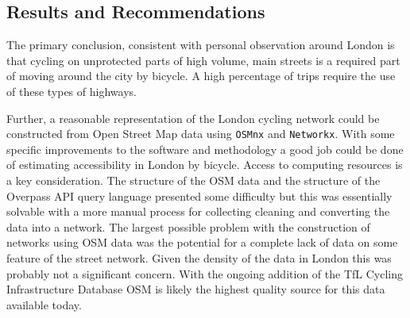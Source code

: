 

%


\subsection{Results and Recommendations}	

The primary conclusion, consistent with personal observation around London is that cycling on unprotected parts of high volume, main streets is a required part of moving around the city by bicycle. A high percentage of trips require the use of these types of highways. 

Further, a reasonable representation of the London cycling network could be constructed from Open Street Map data using \texttt{OSMnx} and \texttt{Networkx}. With some specific improvements to the software and methodology a good job could be done of estimating accessibility in London by bicycle. Access to computing resources is a key consideration. The structure of the OSM data and the structure of the Overpass API query language presented some difficulty but this was essentially solvable with a more manual process for collecting cleaning and converting the data into a network. The largest possible problem with the construction of networks using OSM data was the potential for a complete lack of data on some feature of the street network. Given the density of the data in London this was probably not a significant concern. With the ongoing addition of the TfL Cycling Infrastructure Database OSM is likely the highest quality source for this data available today. 

